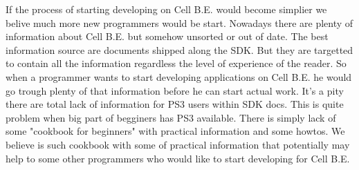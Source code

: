 \par
If the process of starting developing on Cell B.E. would become simplier we belive much more new programmers would be start.
Nowadays there are plenty of information about Cell B.E. but somehow unsorted or out of date.
The best information source are documents shipped along the SDK.
But they are targetted to contain all the information regardless the level of experience of the reader.
So when a programmer wants to start developing applications on Cell B.E. he would go trough plenty of that information before he can start actual work.
It's a pity there are total lack of information for PS3 users within SDK docs.
This is quite problem when big part of begginers has PS3 available.
There is simply lack of some "cookbook for beginners" with practical information and some howtos.
We believe is such cookbook with some of practical information that potentially may help to some other programmers who would like to start developing for Cell B.E.